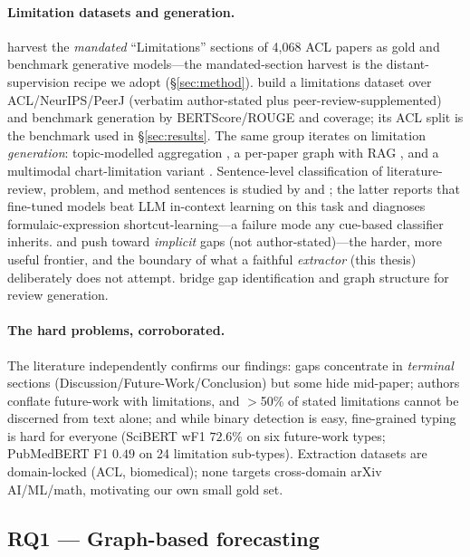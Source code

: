 \paragraph{Limitation datasets and generation.} \citet{limgen2024} harvest the
\emph{mandated} ``Limitations'' sections of 4{,}068 ACL papers as gold and
benchmark generative models---the mandated-section harvest is the
distant-supervision recipe we adopt (\S\ref{sec:method}). \citet{bagels} build a
limitations dataset over ACL/NeurIPS/PeerJ (verbatim author-stated plus
peer-review-supplemented) and benchmark generation by BERTScore/ROUGE and
coverage; its ACL split is the benchmark used in \S\ref{sec:results}. The same
group iterates on limitation \emph{generation}: topic-modelled aggregation
\citep{limtopic}, a per-paper graph with RAG \citep{generatingsuggesti2024}, and a
multimodal chart-limitation variant \citep{mitigatingvisual2024}. Sentence-level
classification of literature-review, problem, and method sentences is studied by
\citet{modellingclassifyi2025} and \citet{extractingproblem2026}; the latter
reports that fine-tuned models beat LLM in-context learning on this task and
diagnoses formulaic-expression shortcut-learning---a failure mode any cue-based
classifier inherits. \citet{gapmap2025} and \citet{canllms2025} push toward
\emph{implicit} gaps (not author-stated)---the harder, more useful frontier, and
the boundary of what a faithful \emph{extractor} (this thesis) deliberately does
not attempt. \citet{mixtureknowledge2024} bridge gap identification and graph
structure for review generation.

\paragraph{The hard problems, corroborated.} The literature independently
confirms our findings: gaps concentrate in \emph{terminal} sections
(Discussion/Future-Work/Conclusion) but some hide mid-paper; authors conflate
future-work with limitations, and $>$50\% of stated limitations cannot be
discerned from text alone; and while binary detection is easy, fine-grained
typing is hard for everyone (SciBERT wF1 $72.6\%$ on six future-work types;
PubMedBERT F1 $0.49$ on 24 limitation sub-types). Extraction datasets are
domain-locked (ACL, biomedical); none targets cross-domain arXiv AI/ML/math,
motivating our own small gold set.

\subsection{RQ1 --- Graph-based forecasting}
\label{sec:lr-rq1}

